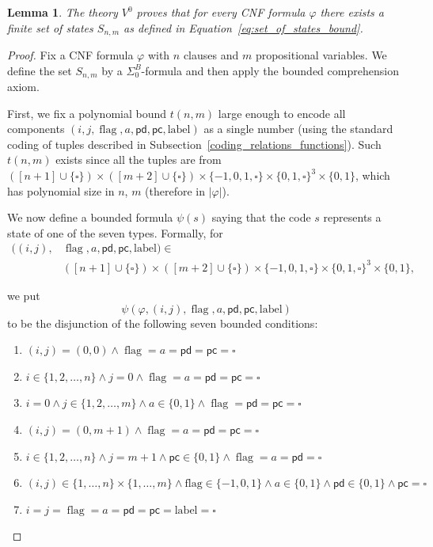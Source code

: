 \documentclass{article}
\theoremstyle{plain}
\newtheorem{lemma}[theorem]{Lemma}
\theoremstyle{definition}
\DeclareMathOperator{\flag}{flag}
\newcommand{\pc}{\mathsf{pc}}
\newcommand{\pd}{\mathsf{pd}}
\begin{document}
\begin{lemma}
The theory $V^0$ proves that for every CNF formula $\varphi$
there exists a finite set of states $S_{n,m}$
as defined in Equation~\eqref{eq:set_of_states_bound}.
\end{lemma}
\begin{proof}
Fix a CNF formula $\varphi$ with $n$ clauses and $m$ propositional variables.
We define the set $S_{n,m}$ by a $\Sigma^B_0$-formula and then apply
the bounded comprehension axiom.

First, we fix a polynomial bound $t(n,m)$ large enough to encode all components
$(i,j,\flag,a,\pd,\pc,\mathrm{label})$ 
as a single number (using the standard coding of tuples described in
Subsection~\ref{coding_relations_functions}).  Such $t(n,m)$ exists since all the tuples are from $([n+1] \cup \{\square\}) \times([m+2]\cup \{\square\})\times\{-1, 0, 1, \square\} \times \{0,1, \square\}^3 \times \{0,1\}$, which has polynomial size in $n$, $m$ (therefore in $|\varphi|$).

We now define a bounded formula $\psi(s)$ saying that the code $s$
represents a state of one of the seven types.
Formally, for
\begin{align*}
((i,j),&\flag,a,\pd,\pc,\mathrm{label})
\in \\& ([n+1]\cup\{\square\})
\times([m+2]\cup\{\square\})
\times\{-1,0,1,\square\}
\times\{0,1,\square\}^3
\times\{0,1\},
\end{align*}

we put
\[
\psi(\varphi,(i,j),\flag,a,\pd,\pc,\mathrm{label})
\]
to be the disjunction of the following seven bounded conditions:

    \begin{enumerate}[label={(\arabic*)}]
        \item $(i, j)=(0,0) \wedge \flag =a=\pd=\pc =\square$ \hfill {}
        \item $i \in \{1, 2, \dots, n \} \wedge j=0 \wedge \flag =a=\pd=\pc =\square$ \hfill {}
        \item $i =0 \wedge j \in \{1, 2, \dots, m \}  \wedge a \in \{0, 1\} \wedge  \flag =\pd=\pc =\square$ \hfill {}
        \item $(i,j) =(0, m+1) \wedge  \flag =a=\pd=\pc =\square$ \hfill{}
        \item $i \in \{1, 2, \dots, n\} \wedge j= m+1 \wedge \mathsf{pc} \in \{0, 1\} \wedge \flag =a=\pd =\square $\hfill {}
        \item $ (i,j) \in \{1, \dots, n\} \times \{1, \dots, m\} \wedge \mathrm{flag}\in \{-1, 0, 1\}  \wedge a \in \{0, 1\} \wedge \mathsf{pd} \in \{0, 1\} \wedge \pc =\square$\hfill {}
        \item $i = j = \flag = a=\pd=\pc = \mathrm{label} = \square$\hfill {}
    \end{enumerate}


\end{proof}
\end{document}

